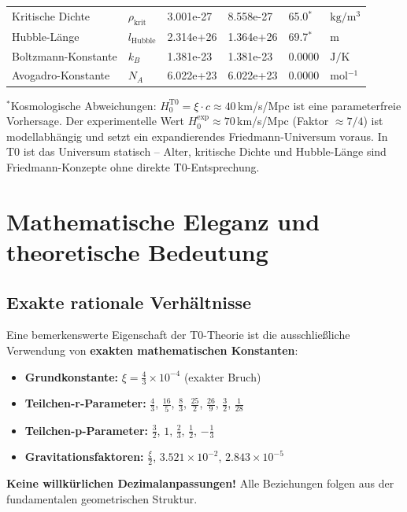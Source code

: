 \documentclass[12pt,a4paper]{report}
\begin{document}
\begin{longtable}{>{\raggedright}p{4.0cm}p{1.2cm}p{1.8cm}p{2.0cm}p{1.6cm}p{2.0cm}}
		Kritische Dichte & $\rho_{\text{krit}}$ & 3.001e-27 & 8.558e-27 & 65.0$^*$ & $\si{\kilogram \per \meter^3}$ \\
		Hubble-Länge & $l_{\text{Hubble}}$ & 2.314e+26 & 1.364e+26 & 69.7$^*$ & $\si{\meter}$ \\
		Boltzmann-Konstante & $k_B$ & 1.381e-23 & 1.381e-23 & 0.0000 & $\si{\joule \per \kelvin}$ \\
		Avogadro-Konstante & $N_A$ & 6.022e+23 & 6.022e+23 & 0.0000 & $\si{\mole^{-1}}$ \\
	\end{longtable}
	\normalsize
	
	{\small $^*$Kosmologische Abweichungen: $H_0^{\text{T0}} = \xi \cdot c \approx 40\,$km/s/Mpc ist eine parameterfreie Vorhersage. Der experimentelle Wert $H_0^{\text{exp}} \approx 70\,$km/s/Mpc (Faktor $\approx 7/4$) ist modellabhängig und setzt ein expandierendes Friedmann-Universum voraus. In T0 ist das Universum statisch -- Alter, kritische Dichte und Hubble-Länge sind Friedmann-Konzepte ohne direkte T0-Entsprechung.}
	
	\section{Mathematische Eleganz und theoretische Bedeutung}
	
	\subsection{Exakte rationale Verhältnisse}
	
	Eine bemerkenswerte Eigenschaft der T0-Theorie ist die ausschließliche Verwendung von \textbf{exakten mathematischen Konstanten}:
	
	\begin{itemize}
		\item \textbf{Grundkonstante:} $\xi = \frac{4}{3} \times 10^{-4}$ (exakter Bruch)
		\item \textbf{Teilchen-r-Parameter:} $\frac{4}{3}$, $\frac{16}{5}$, $\frac{8}{3}$, $\frac{25}{2}$, $\frac{26}{9}$, $\frac{3}{2}$, $\frac{1}{28}$
		\item \textbf{Teilchen-p-Parameter:} $\frac{3}{2}$, $1$, $\frac{2}{3}$, $\frac{1}{2}$, $-\frac{1}{3}$
		\item \textbf{Gravitationsfaktoren:} $\frac{\xi}{2}$, $3.521 \times 10^{-2}$, $2.843 \times 10^{-5}$
	\end{itemize}
	
	\textcolor{t0green}{\textbf{Keine willkürlichen Dezimalanpassungen!}} Alle Beziehungen folgen aus der fundamentalen geometrischen Struktur.
	
\end{document}
